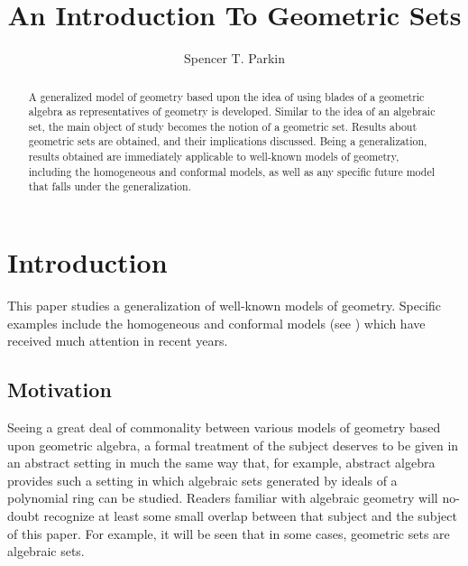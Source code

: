 \documentclass{birkjour}
\theoremstyle{definition}
\theoremstyle{remark}
\numberwithin{equation}{section}
\begin{document}
\title{An Introduction To Geometric Sets}

\author{Spencer T. Parkin}
\address{102 W. 500 S., \\
Salt Lake City, UT  84101} 



\begin{abstract}
A generalized model of geometry based upon the idea of using blades of a geometric algebra
as representatives of geometry is developed.  Similar to the idea of an algebraic set, the main object of study
becomes the notion of a geometric set.  Results about geometric sets are obtained, and their implications discussed.
Being a generalization, results obtained are immediately applicable to well-known models of geometry,
including the homogeneous and conformal models, as well as any specific future model that falls
under the generalization.
\end{abstract}


\maketitle

\section{Introduction}

This paper studies a generalization of well-known models of geometry.
Specific examples include the homogeneous and conformal models (see \cite{Dorst07,Hestenes01,Lasenby04})
which have received much attention in recent years.

\subsection{Motivation}

Seeing a great deal of commonality between various models of geometry based upon
geometric algebra, a formal treatment of the subject deserves to be given in an abstract
setting in much the same way that, for example, abstract algebra provides such a setting
in which algebraic sets generated by ideals of a polynomial ring can be studied.
Readers familiar with algebraic geometry will no-doubt recognize at least some small overlap
between that subject and the subject of this paper.  For example, it will be seen
that in some cases, geometric sets are algebraic sets.
\end{document}
